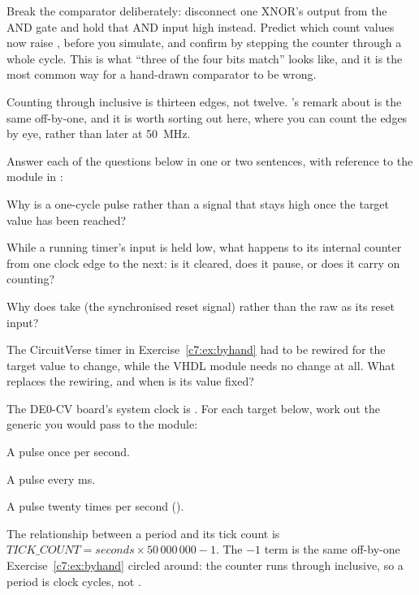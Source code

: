 Break the comparator deliberately: disconnect one XNOR's output from the AND gate and hold
that AND input high instead. Predict which count values now raise , before you
simulate, and confirm by stepping the counter through a whole cycle. This is what ``three of the
four bits match'' looks like, and it is the most common way for a hand-drawn comparator to be wrong.

\note[Hint]Counting  through  inclusive is thirteen edges, not twelve.
's remark about  is the same off-by-one, and it is worth
sorting out here, where you can count the edges by eye, rather than later at 50~MHz.

\label{c7:ex:questions}
Answer each of the questions below in one or two sentences, with reference to the 
module in :

 Why is  a one-cycle pulse rather than a signal that stays high once the
target value has been reached?

 While a running timer's  input is held low, what happens to its internal
counter from one clock edge to the next: is it cleared, does it pause, or does it carry on counting?

 Why does  take  (the synchronised reset signal) rather than
the raw  as its reset input?

 The CircuitVerse timer in Exercise~\ref{c7:ex:byhand} had to be rewired for the target
value to change, while the VHDL module needs no change at all. What replaces the rewiring, and when
is its value fixed?


\label{c7:ex:ticks}
The DE0-CV board's system clock is . For each target below, work out the
 generic you would pass to the  module:

 A  pulse once per second.

 A  pulse every  ms.

 A  pulse twenty times per second ().

\note[Hint]The relationship between a period and its tick count is
$\mathit{TICK\_COUNT} = \mathit{seconds} \times 50\,000\,000 - 1$. The $-1$ term is the same
off-by-one Exercise~\ref{c7:ex:byhand} circled around: the counter runs  through
 inclusive, so a period is  clock cycles, not
.

